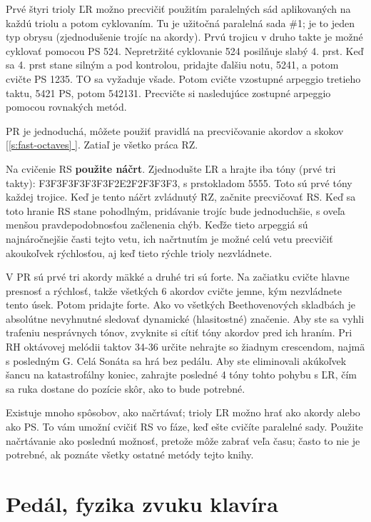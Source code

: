\documentclass[11pt,a4paper]{book}
\newcommand*{\fullref}[1]{\hyperref[{#1}]{\ref*{#1} \nameref*{#1}}} %
\newcommand*{\fullrefp}[1]{[\fullref{#1}]} %
\begin{document}
Prvé štyri trioly ĽR možno precvičiť použitím paralelných sád aplikovaných na každú triolu a potom cyklovaním. Tu je užitočná paralelná sada \#1; je to jeden typ obrysu (zjednodušenie trojíc na akordy). Prvú trojicu v druho  takte je možné cyklovať pomocou PS 524. Nepretržité cyklovanie 524 posilňuje slabý 4. prst. Keď sa 4. prst stane silným a pod kontrolou, pridajte ďalšiu notu, 5241, a potom cvičte PS 1235. TO sa vyžaduje všade. Potom cvičte vzostupné arpeggio tretieho taktu, 5421 PS, potom 542131. Precvičte si nasledujúce zostupné arpeggio pomocou rovnakých metód.

PR je jednoduchá, môžete použiť pravidlá na precvičovanie akordov a skokov \fullrefp{s:fast-octaves}. Zatiaľ je všetko práca RZ.

Na cvičenie RS \textbf{použite náčrt}. Zjednodušte ĽR a hrajte iba tóny (prvé tri takty): F3F3F3F3\textbar F3F3F2E2\textbar F2F3F3F3, s prstokladom 5555. Toto sú prvé tóny každej trojice. Keď je tento náčrt zvládnutý RZ, začnite precvičovať RS. Keď sa toto hranie RS stane pohodlným, pridávanie trojíc bude jednoduchšie, s oveľa menšou pravdepodobnosťou začlenenia chýb. Keďže tieto arpeggiá sú najnáročnejšie časti tejto vetu, ich načrtnutím je možné celú vetu precvičiť akoukoľvek rýchlosťou, aj keď tieto rýchle trioly nezvládnete.

V PR sú prvé tri akordy mäkké a druhé tri sú forte. Na začiatku cvičte hlavne presnosť a rýchlosť, takže všetkých 6 akordov cvičte jemne, kým nezvládnete tento úsek. Potom pridajte forte. Ako vo všetkých Beethovenových skladbách je absolútne nevyhnutné sledovať dynamické (hlasitostné) značenie. Aby ste sa vyhli trafeniu nesprávnych tónov, zvyknite si cítiť tóny akordov pred ich hraním. Pri RH oktávovej melódii taktov 34-36 určite nehrajte so žiadnym crescendom, najmä s posledným G. Celá Sonáta sa hrá bez pedálu. Aby ste eliminovali akúkoľvek šancu na katastrofálny koniec, zahrajte posledné 4 tóny tohto pohybu s ĽR, čím sa ruka dostane do pozície skôr, ako to bude potrebné.

Existuje mnoho spôsobov, ako načrtávať; trioly ĽR možno hrať ako akordy alebo ako PS. To vám umožní cvičiť RS vo fáze, keď ešte cvičíte paralelné sady. Použite načrtávanie ako poslednú možnosť, pretože môže zabrať veľa času; často to nie je potrebné, ak poznáte všetky ostatné metódy tejto knihy.

\section{Pedál, fyzika zvuku klavíra}\label{s:damper-pedal}
\end{document}
